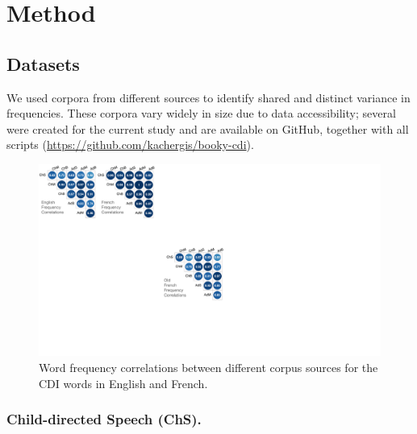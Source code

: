 \documentclass[10pt, letterpaper]{article}
\newenvironment{CodeChunk}{}{}
\begin{document}
\hypertarget{method}{%
\section{Method}\label{method}}

\hypertarget{datasets}{%
\subsection{Datasets}\label{datasets}}

We used corpora from different sources to identify shared and distinct
variance in frequencies. These corpora vary widely in size due to data
accessibility; several were created for the current study and are
available on GitHub, together with all scripts
(\url{https://github.com/kachergis/booky-cdi}).

\begin{CodeChunk}
\begin{figure}[t]

{\centering \includegraphics[width=\linewidth]{figs/corpus_freq_cors_hor} 

}

\caption[Word frequency correlations between different corpus sources for the CDI words in English and French]{Word frequency correlations between different corpus sources for the CDI words in English and French.}\label{fig:fig1}
\end{figure}
\end{CodeChunk}

\hypertarget{child-directed-speech-chs.}{%
\subsubsection{Child-directed Speech
(ChS).}\label{child-directed-speech-chs.}}
\end{document}
